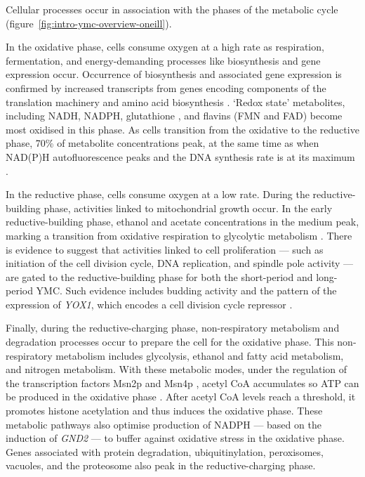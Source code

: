 Cellular processes occur in association with the phases of the metabolic cycle (figure~\ref{fig:intro-ymc-overview-oneill}).

In the oxidative phase, cells consume oxygen at a high rate as respiration, fermentation, and
energy-demanding processes
like biosynthesis and gene expression occur.
Occurrence of biosynthesis and associated gene expression is confirmed by increased transcripts from genes encoding components of the translation machinery and amino acid biosynthesis \parencite{tuLogicYeastMetabolic2005}.
`Redox state' metabolites, including NADH, NADPH, glutathione \parencite{lloydUltradianMetronomeTimekeeper2005}, and flavins (FMN and FAD)
\parencite{murrayRedoxRegulationRespiring2011} become most oxidised in this phase.
As cells transition from the oxidative to the reductive phase, 70\% of metabolite concentrations peak, at the same time as when NAD(P)H autofluorescence peaks and the DNA synthesis rate is at its maximum \parencite{lloydTemporalArchitectureEukaryotic2006}.

In the reductive phase, cells consume oxygen at a low rate.
During the reductive-building phase, activities linked to mitochondrial growth occur.
In the early reductive-building phase, ethanol and acetate concentrations in the medium peak, marking a transition from oxidative respiration to glycolytic metabolism \parencite{tuCyclicChangesMetabolic2007}.
There is evidence to suggest that activities linked to cell proliferation --- such as initiation of the cell division cycle, DNA replication, and spindle pole activity --- are gated to the reductive-building phase for both the short-period and long-period YMC.
Such evidence includes budding activity and the pattern of the expression of \emph{YOX1}, which encodes a cell division cycle repressor \parencite{tuLogicYeastMetabolic2005}.

Finally, during the reductive-charging phase,
non-respiratory metabolism and degradation processes occur to prepare the cell for the oxidative phase.
This non-respiratory metabolism includes glycolysis, ethanol and fatty acid metabolism, and nitrogen metabolism.
With these metabolic modes, under the regulation of the transcription factors Msn2p and Msn4p \parencite{kuangMsn2RegulateExpression2017}, acetyl CoA accumulates so ATP can be produced in the oxidative phase \parencite{tuLogicYeastMetabolic2005}.
After acetyl CoA levels reach a threshold, it promotes histone acetylation and thus induces the oxidative phase.
These metabolic pathways also optimise production of NADPH --- based on the induction of \emph{GND2} --- to buffer against oxidative stress in the oxidative phase.
Genes associated with protein degradation, ubiquitinylation, peroxisomes, vacuoles, and the proteosome also peak in the reductive-charging phase.

